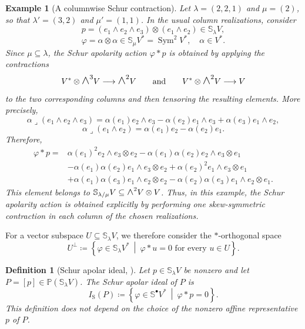 \documentclass[a4paper,reqno]{amsart}
\theoremstyle{plainnopunct}
\theoremstyle{definitionnopunct}
\newtheorem{definition}[definition]{Definition}
\newtheorem{example}[example]{Example}
\newcommand{\superwedge}{\mathlarger{\mathlarger{\wedge}}}
\renewcommand{\P}{\mathbb{P}}
\renewcommand{\S}{\mathbb{S}}
\newcommand{\Sym}{\operatorname{Sym}}
\begin{document}
\begin{example}[A columnwise Schur contraction]
\label{ex: columnwise Schur contraction}
Let $\lambda=(2,2,1)$ and $\mu=(2)$, so that $\lambda'=(3,2)$ and  $\mu'=(1,1)$.  In the usual column realizations, consider
\[
p
=
(e_1\wedge e_2\wedge e_3)
\otimes
(e_1\wedge e_2)
\in
\S_\lambda V,
\]
\[
\varphi
=
\alpha\otimes\alpha
\in
\S_\mu V^*
=
\Sym^2V^*,
\quad
\alpha\in V^*.
\]
Since $\mu\subseteq\lambda$, the Schur apolarity action $\varphi*p$ is obtained by applying the contractions
\[
V^*\otimes\superwedge^3V \longrightarrow \superwedge^2V \qquad \text{and} \qquad V^*\otimes\superwedge^2V \longrightarrow V
\]
to the two corresponding columns and then tensoring the resulting elements. More precisely,
\[
\alpha\lrcorner
(e_1\wedge e_2\wedge e_3)
=
\alpha(e_1)e_2\wedge e_3
-
\alpha(e_2)e_1\wedge e_3
+
\alpha(e_3)e_1\wedge e_2,
\]
\[
\alpha\lrcorner
(e_1\wedge e_2)
=
\alpha(e_1)e_2
-
\alpha(e_2)e_1.
\]
Therefore,
\[
\begin{aligned}
\varphi*p
={}&
\alpha(e_1)^2
e_2\wedge e_3\otimes e_2
-
\alpha(e_1)\alpha(e_2)
e_2\wedge e_3\otimes e_1
\\
&-
\alpha(e_1)\alpha(e_2)
e_1\wedge e_3\otimes e_2
+
\alpha(e_2)^2
e_1\wedge e_3\otimes e_1
\\
&+
\alpha(e_1)\alpha(e_3)
e_1\wedge e_2\otimes e_2
-
\alpha(e_2)\alpha(e_3)
e_1\wedge e_2\otimes e_1.
\end{aligned}
\]
This element belongs to $\S_{\lambda/\mu}V
\subseteq
\superwedge^2V\otimes V$.
Thus, in this example, the Schur apolarity action is obtained explicitly by performing one skew-symmetric contraction in each column of the chosen realizations.
\end{example}

For a vector subspace $U\subseteq\S_\lambda V$, we therefore consider the $*$-orthogonal space
\[
U^\perp
\coloneq
\left\{
\varphi\in\S_\lambda V^*
\ \middle|\
\varphi*u=0
\text{ for every }u\in U
\right\}.
\]

\begin{definition}[Schur apolar ideal, {\cite[Definition~3.9]{Staffolani2023}}]
\label{def: Schur apolar ideal}
Let $p\in\S_\lambda V$ be nonzero and let $P=[p]\in\P(\S_\lambda V)$. The \emph{Schur apolar ideal} of $P$ is
\[I_{\mathrm S}(P)
\coloneq
\left\{
\varphi\in\S^\bullet V^*
\ \middle|\
\varphi*p=0
\right\}.\]
This definition does not depend on the choice of the nonzero affine representative $p$ of $P$.
\end{definition}
\end{document}
